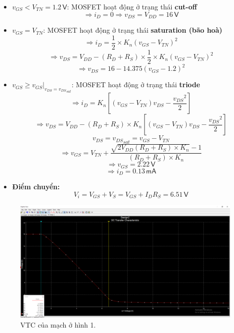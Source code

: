 \begin{itemize}[label=-]
	\item $v_{GS}<V_{TN}=1.2\,\textsf{V}$: MOSFET hoạt động ở trạng thái \textbf{cut-off}  
	\[
	\Rightarrow i_{D}=0 \Rightarrow v_{DS}=V_{DD}=16\,\textsf{V}
	\]
	
	\item $v_{GS}=V_{TN}$: MOSFET hoạt động ở trạng thái \textbf{saturation (bão hoà)}  
	\[
	\Rightarrow i_{D}=\frac{1}{2}\times K_{n}\left(v_{GS}-V_{TN}\right)^{2}
	\]
	\[
	\Rightarrow v_{DS}=V_{DD}-\left(R_{D}+R_{S}\right)\times\frac{1}{2}\times K_{n}\left(v_{GS}-V_{TN}\right)^{2}
	\]
	\[
	\Rightarrow v_{DS}=16-14.375\left(v_{GS}-1.2\right)^{2}
	\]
	
	\item $v_{GS}\geq\left.v_{GS}\right|_{v_{DS}={v_{DS}}_{sat}}$: MOSFET hoạt động ở trạng thái \textbf{triode}  
	\[
	\Rightarrow i_{D}=K_{n}\left[\left(v_{GS}-V_{TN}\right)v_{DS}-\frac{{v_{DS}}^{2}}{2}\right]
	\]
	\[
	\Rightarrow v_{DS}=V_{DD}-\left(R_{D}+R_{S}\right)\times K_{n}\left[\left(v_{GS}-V_{TN}\right)v_{DS}-\frac{{v_{DS}}^{2}}{2}\right]
	\]
	\[
	v_{DS}={v_{DS}}_{sat}=v_{GS}-V_{TN}
	\]
	\[
	\Rightarrow v_{GS}=V_{TN}+\frac{\sqrt{2V_{DD}\left(R_{D}+R_{S}\right)\times K_{n}}-1}{\left(R_{D}+R_{S}\right)\times K_{n}}
	\]
	\[
	\Rightarrow v_{GS}=2.22\,\textsf{V}
	\]
	\[
	\Rightarrow i_{D}=0.13\,\textsf{mA}
	\]
	
	\item \textbf{Điểm chuyển:}  
	\[
	V_{i}=V_{GS}+V_{S}=V_{GS}+I_{D}R_{S}=6.51\,\textsf{V}
	\]
\end{itemize}

\begin{figure}[H]
	\centering
	\includegraphics[width=\linewidth]{./my-chapters/my-images/Question1/a1_VTC.png}
	\caption{VTC của mạch ở hình 1.}
\end{figure}

